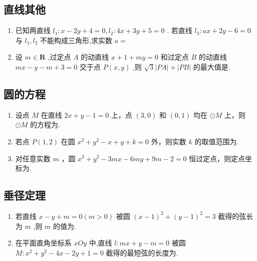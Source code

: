 \subsection*{直线其他}
\begin{enumerate}
    \item 已知两直线 $l_1 : x - 2y + 4 = 0,l_2 : 4x + 3y + 5 = 0$ . 若直线 $l_3 : ax + 2y - 6 = 0$ 与 $l_1,l_2$ 不能构成三角形,求实数 $a =$
    \item 设 $m \in \mathbf{R}$ ,过定点 $A$ 的动直线 $x + 1 + my = 0$ 和过定点 $B$ 的动直线 $mx - y - m + 3 = 0$ 交于点 $P(x,y)$ ,则 $\sqrt{3}|PA| + |PB|$ 的最大值是.
\end{enumerate}
\subsection*{圆的方程}
\begin{enumerate}
    \item 设点 $M$ 在直线 $2x + y - 1 = 0$ 上，点 $(3,0)$ 和 $(0,1)$ 均在 $\odot M$ 上，则 $\odot M$ 的方程为.
    \item 若点 $P(1,2)$ 在圆 $x^2 + y^2 - x + y + k = 0$ 外，则实数 $k$ 的取值范围为.
    \item 对任意实数 $m$ ，圆 $x^2 + y^2 - 3mx - 6my + 9m - 2 = 0$ 恒过定点，则定点坐标为.
\end{enumerate}
\subsection*{垂径定理}
\begin{enumerate}
    \item 若直线 $x - y + m = 0(m > 0)$ 被圆 $\left( x - 1\right)^2 + \left( y - 1\right)^2 = 3$ 截得的弦长为 $m$ ,则 $m$ 的值为.
    \item 在平面直角坐标系 $xOy$ 中,直线 $l : mx + y - m = 0$ 被圆 $M : x^2 + y^2 - 4x - 2y + 1 = 0$ 截得的最短弦的长度为.
\end{enumerate}
